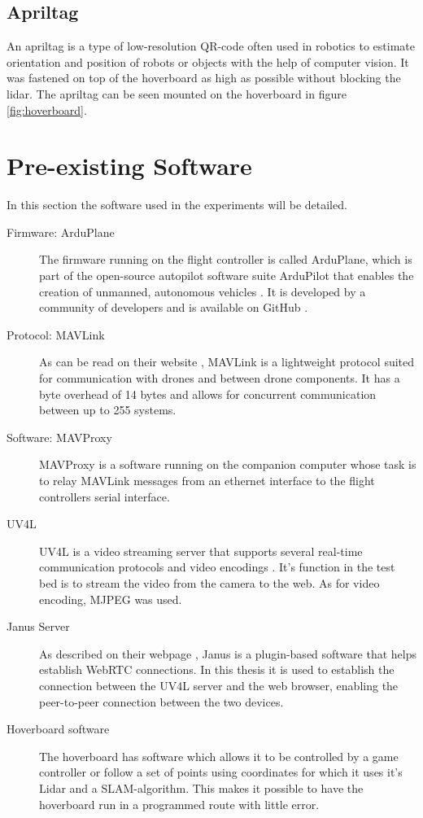 \documentclass[nofilelist]{cslthse-msc}
\begin{document}
\subsection{Apriltag}
An apriltag is a type of low-resolution QR-code often used in robotics to estimate orientation and position of robots or objects with the help of computer vision. It was fastened on top of the hoverboard as high as possible without blocking the lidar. The apriltag can be seen mounted on the hoverboard in figure \ref{fig:hoverboard}.

\section{Pre-existing Software}
In this section the software used in the experiments will be detailed.
\begin{description}
   \item[Firmware: ArduPlane]
   The firmware running on the flight controller is called ArduPlane, which is part of the open-source autopilot software suite ArduPilot that enables the creation of unmanned, autonomous vehicles \cite{ardupilot-org}. It is developed by a community of developers and is available on GitHub \cite{ardupilot-github}.
   
   \item[Protocol: MAVLink]
   As can be read on their website \cite{mavlink}, MAVLink is a lightweight protocol suited for communication with drones and between drone components. It has a byte overhead of 14 bytes and allows for concurrent communication between up to 255 systems. 

   \item [Software: MAVProxy]
   MAVProxy \cite{mavproxy} is a software running on the companion computer whose task is to relay MAVLink messages from an ethernet interface to the flight controllers serial interface. 

   \item[UV4L]
   UV4L is a video streaming server that supports several real-time communication protocols and video encodings \cite{uv4l}. It's function in the test bed is to stream the video from the camera to the web. As for video encoding, MJPEG was used.
   
   \item[Janus Server]
   As described on their webpage \cite{janus}, Janus is a plugin-based software that helps establish WebRTC connections. In this thesis it is used to establish the connection between the UV4L server and the web browser, enabling the peer-to-peer connection between the two devices.

   \item[Hoverboard software] The hoverboard has software which allows it to be controlled by a game controller or follow a set of points using coordinates for which it uses it's Lidar and a SLAM-algorithm. This makes it possible to have the hoverboard run in a programmed route with little error. 
\end{description}
\end{document}

